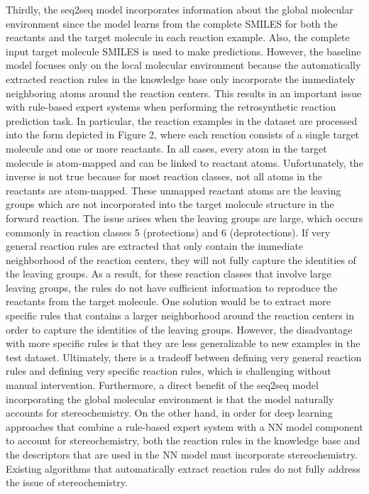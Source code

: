 Thirdly, the seq2seq model incorporates information about the global molecular environment since the model learns from the complete SMILES for both the reactants and the target molecule in each reaction example. Also, the complete input target molecule SMILES is used to make predictions. However, the baseline model focuses only on the local molecular environment because the automatically extracted reaction rules in the knowledge base only incorporate the immediately neighboring atoms around the reaction centers. This results in an important issue with rule-based expert systems when performing the retrosynthetic reaction prediction task. In particular, the reaction examples in the dataset are processed into the form depicted in Figure 2, where each reaction consists of a single target molecule and one or more reactants. In all cases, every atom in the target molecule is atom-mapped and can be linked to reactant atoms. Unfortunately, the inverse is not true because for most reaction classes, not all atoms in the reactants are atom-mapped. These unmapped reactant atoms are the leaving groups which are not incorporated into the target molecule structure in the forward reaction. The issue arises when the leaving groups are large, which occurs commonly in reaction classes 5 (protections) and 6 (deprotections). If very general reaction rules are extracted that only contain the immediate neighborhood of the reaction centers, they will not fully capture the identities of the leaving groups. As a result, for these reaction classes that involve large leaving groups, the rules do not have sufficient information to reproduce the reactants from the target molecule. One solution would be to extract more specific rules that contains a larger neighborhood around the reaction centers in order to capture the identities of the leaving groups. However, the disadvantage with more specific rules is that they are less generalizable to new examples in the test dataset. Ultimately, there is a tradeoff between defining very general reaction rules and defining very specific reaction rules, which is challenging without manual intervention. Furthermore, a direct benefit of the seq2seq model incorporating the global molecular environment is that the model naturally accounts for stereochemistry. On the other hand, in order for deep learning approaches that combine a rule-based expert system with a NN model component to account for stereochemistry, both the reaction rules in the knowledge base and the descriptors that are used in the NN model must incorporate stereochemistry. Existing algorithms that automatically extract reaction rules do not fully address the issue of stereochemistry. 

